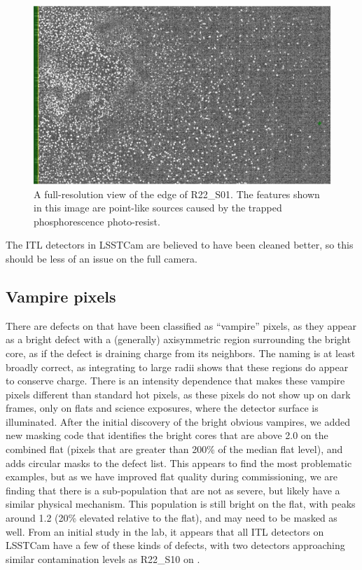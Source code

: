 \begin{figure}
  \begin{center}
  \includegraphics[width=\textwidth]{figures/isr-f02-phosphorescence_point_like.pdf}
  \caption{A full-resolution view of the edge of R22\_S01.  The features shown in this image are point-like sources caused by the trapped phosphorescence photo-resist.}
  \end{center}
\end{figure}

The ITL detectors in LSSTCam are believed to have been cleaned better, so this should be less of an issue on the full camera.

\subsection{Vampire pixels}

There are defects on \ComCam that have been classified as ``vampire'' pixels, as they appear as a bright defect with a (generally) axisymmetric region surrounding the bright core, as if the defect is draining charge from its neighbors.
The naming is at least broadly correct, as integrating to large radii shows that these regions do appear to conserve charge.
There is an intensity dependence that makes these vampire pixels different than standard hot pixels, as these pixels do not show up on dark frames, only on flats and science exposures, where the detector surface is illuminated.
After the initial discovery of the bright obvious vampires, we added new masking code that identifies the bright cores that are above 2.0 on the combined flat (pixels that are greater than 200\% of the median flat level), and adds circular masks to the defect list.
This appears to find the most problematic examples, but as we have improved flat quality during commissioning, we are finding that there is a sub-population that are not as severe, but likely have a similar physical mechanism.
This population is still bright on the flat, with peaks around 1.2 (20\% elevated relative to the flat), and may need to be masked as well.
From an initial study in the lab, it appears that all ITL detectors on LSSTCam have a few of these kinds of defects, with two detectors approaching similar contamination levels as R22\_S10 on \ComCam.

